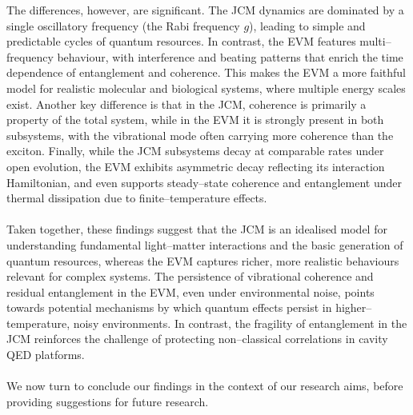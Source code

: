 \documentclass[11pt]{article}
\begin{document}
The differences, however, are significant. The JCM dynamics are dominated by a single oscillatory frequency (the Rabi frequency $g$), leading to simple and predictable cycles of quantum resources. In contrast, the EVM features multi--frequency behaviour, with interference and beating patterns that enrich the time dependence of entanglement and coherence. This makes the EVM a more faithful model for realistic molecular and biological systems, where multiple energy scales exist. Another key difference is that in the JCM, coherence is primarily a property of the total system, while in the EVM it is strongly present in both subsystems, with the vibrational mode often carrying more coherence than the exciton. Finally, while the JCM subsystems decay at comparable rates under open evolution, the EVM exhibits asymmetric decay reflecting its interaction Hamiltonian, and even supports steady--state coherence and entanglement under thermal dissipation due to finite--temperature effects.\\
\\
Taken together, these findings suggest that the JCM is an idealised model for understanding fundamental light--matter interactions and the basic generation of quantum resources, whereas the EVM captures richer, more realistic behaviours relevant for complex systems. The persistence of vibrational coherence and residual entanglement in the EVM, even under environmental noise, points towards potential mechanisms by which quantum effects persist in higher--temperature, noisy environments. In contrast, the fragility of entanglement in the JCM reinforces the challenge of protecting non--classical correlations in cavity QED platforms.\\
\\
We now turn to conclude our findings in the context of our research aims, before providing suggestions for future research. 

\newpage
\end{document}
